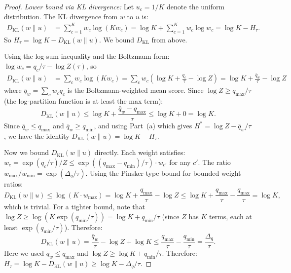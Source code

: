 \documentclass{article}
\theoremstyle{definition}
\theoremstyle{plain}
\theoremstyle{remark}
\begin{document}
\begin{proof}
\emph{Lower bound via KL divergence:} Let $u_c = 1/K$ denote the uniform distribution.
The KL divergence from $w$ to $u$ is:
\begin{align}
  D_{\mathrm{KL}}(w \| u) &= \sum_{c=1}^K w_c \log(K w_c)
  = \log K + \sum_{c=1}^K w_c \log w_c
  = \log K - H_\tau.
\end{align}
So $H_\tau = \log K - D_{\mathrm{KL}}(w \| u)$. We bound $D_{\mathrm{KL}}$ from above.

Using the log-sum inequality and the Boltzmann form:
$\log w_c = q_c/\tau - \log Z(\tau)$, so
\begin{align}
  D_{\mathrm{KL}}(w \| u) &= \sum_c w_c \log(K w_c)
  = \sum_c w_c \left(\log K + \frac{q_c}{\tau} - \log Z\right)
  = \log K + \frac{\bar{q}_w}{\tau} - \log Z
\end{align}
where $\bar{q}_w = \sum_c w_c q_c$ is the Boltzmann-weighted mean score. Since
$\log Z \geq q_{\max}/\tau$ (the log-partition function is at least the max term):
\begin{equation}
  D_{\mathrm{KL}}(w \| u) \leq \log K + \frac{\bar{q}_w - q_{\max}}{\tau}
  \leq \log K + 0 = \log K.
\end{equation}
Since $\bar{q}_w \leq q_{\max}$ and $\bar{q}_w \geq q_{\min}$, and using
Part~(a) which gives $H^* = \log Z - \bar{q}_w/\tau$, we have the identity
$D_{\mathrm{KL}}(w \| u) = \log K - H_\tau$.

Now we bound $D_{\mathrm{KL}}(w \| u)$ directly. Each weight satisfies:
$w_c = \exp(q_c/\tau)/Z \leq \exp((q_{\max} - q_{\min})/\tau) \cdot w_{c'}$ for any $c'$.
The ratio $w_{\max}/w_{\min} = \exp(\Delta_q/\tau)$. Using the Pinsker-type bound for
bounded weight ratios:
\begin{equation}
  D_{\mathrm{KL}}(w \| u) \leq \log(K \cdot w_{\max})
  = \log K + \frac{q_{\max}}{\tau} - \log Z
  \leq \log K + \frac{q_{\max}}{\tau} - \frac{q_{\max}}{\tau}
  = \log K,
\end{equation}
which is trivial. For a tighter bound, note that
$\log Z \geq \log(K \exp(q_{\min}/\tau)) = \log K + q_{\min}/\tau$ (since $Z$ has $K$
terms, each at least $\exp(q_{\min}/\tau)$). Therefore:
\begin{equation}
  D_{\mathrm{KL}}(w \| u) = \frac{\bar{q}_w}{\tau} - \log Z + \log K
  \leq \frac{q_{\max}}{\tau} - \frac{q_{\min}}{\tau} = \frac{\Delta_q}{\tau}.
\end{equation}
Here we used $\bar{q}_w \leq q_{\max}$ and $\log Z \geq \log K + q_{\min}/\tau$.
Therefore: $H_\tau = \log K - D_{\mathrm{KL}}(w \| u) \geq \log K - \Delta_q/\tau$.


\end{proof}
\end{document}
